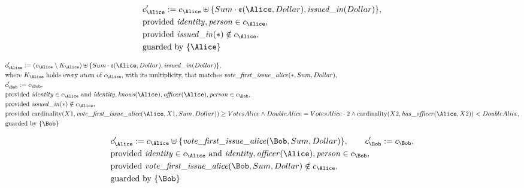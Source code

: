 \begin{align*}
&
c'_
{
\Alice
}
 := 
c_
{
\Alice
}
 \uplus 
\{
Sum
\cdot
\text{\textcent}
(
\Alice
,
Dollar
)
,
\mathit{\detokenize{
issued_in
}}
(
Dollar
)
\}
,\\
&
\text{provided } 
\mathit{\detokenize{
identity
}}
,
\mathit{\detokenize{
person
}}
 \in c_
{
\Alice
}
,\\
&
\text{provided } 
\mathit{\detokenize{
issued_in
}}
(
\ast
)
 \notin c_
{
\Alice
}
,\\
&
\text{guarded by } \{
\Alice
\}
\end{align*}

\begin{align*}
&
c'_
{
\Alice
}
 := 
(
c_
{
\Alice
}
 \setminus K_
{
\Alice
}
) \uplus 
\{
Sum
\cdot
\text{\textcent}
(
\Alice
,
Dollar
)
,
\mathit{\detokenize{
issued_in
}}
(
Dollar
)
\}
,\\
&
\text{where } K_
{
\Alice
}
 \text{ holds every atom of } c_
{
\Alice
}
 \text{, with its multiplicity, that matches } 
\mathit{\detokenize{
vote_first_issue_alice
}}
(
\ast
,
Sum
,
Dollar
)
,\\
&
c'_
{
\Bob
}
 := 
c_
{
\Bob
}
,\\
&
\text{provided } 
\mathit{\detokenize{
identity
}}
 \in c_
{
\Alice
}
 \text{ and } 
\mathit{\detokenize{
identity
}}
,
\mathit{\detokenize{
knows
}}
(
\Alice
)
,
\mathit{\detokenize{
officer
}}
(
\Alice
)
,
\mathit{\detokenize{
person
}}
 \in c_
{
\Bob
}
,\\
&
\text{provided } 
\mathit{\detokenize{
issued_in
}}
(
\ast
)
 \notin c_
{
\Alice
}
,\\
&
\text{provided } 
\mathrm{cardinality}(
X1
,
\mathit{\detokenize{
vote_first_issue_alice
}}
(
\Alice
,
X1
,
Sum
,
Dollar
)
)
\ge
VotesAlice
\land
DoubleAlice
=
VotesAlice
\cdot
2
\land
\mathrm{cardinality}(
X2
,
\mathit{\detokenize{
has_officer
}}
(
\Alice
,
X2
)
)
<
DoubleAlice
,\\
&
\text{guarded by } \{
\Bob
\}
\end{align*}

\begin{align*}
&
c'_
{
\Alice
}
 := 
c_
{
\Alice
}
 \uplus 
\{
\mathit{\detokenize{
vote_first_issue_alice
}}
(
\Bob
,
Sum
,
Dollar
)
\}
, \qquad 
c'_
{
\Bob
}
 := 
c_
{
\Bob
}
,\\
&
\text{provided } 
\mathit{\detokenize{
identity
}}
 \in c_
{
\Alice
}
 \text{ and } 
\mathit{\detokenize{
identity
}}
,
\mathit{\detokenize{
officer
}}
(
\Alice
)
,
\mathit{\detokenize{
person
}}
 \in c_
{
\Bob
}
,\\
&
\text{provided } 
\mathit{\detokenize{
vote_first_issue_alice
}}
(
\Bob
,
Sum
,
Dollar
)
 \notin c_
{
\Alice
}
,\\
&
\text{guarded by } \{
\Bob
\}
\end{align*}
